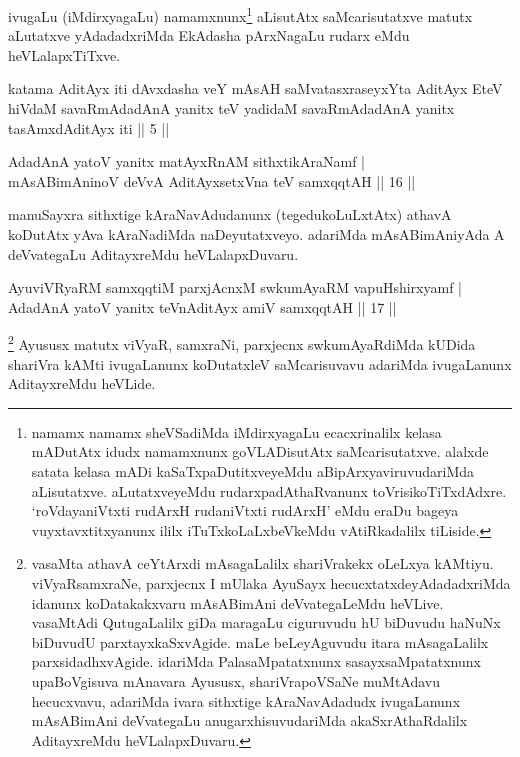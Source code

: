 \begin{artha}
ivugaLu (iMdirxyagaLu) namamxnunx\footnote[1]{namamx namamx sheVSadiMda iMdirxyagaLu ecacxrinalilx kelasa mADutAtx idudx namamxnunx goVLADisutAtx saMcarisutatxve. alalxde satata kelasa mADi kaSaTxpaDutitxveyeMdu aBipArxyaviruvudariMda aLisutatxve. aLutatxveyeMdu rudarxpadAthaRvanunx toVrisikoTiTxdAdxre. `roVdayaniVtxti rudArxH rudaniVtxti rudArxH' eMdu eraDu bageya vuyxtavxtitxyanunx ililx iTuTxkoLaLxbeVkeMdu vAtiRkadalilx tiLiside.} aLisutAtx saMcarisutatxve matutx aLutatxve yAdadadxriMda EkAdasha pArxNagaLu rudarx eMdu heVLalapxTiTxve.
\end{artha}



\begin{kandikeshl}
katama AditAyx iti dAvxdasha veY mAsAH saMvatasxraseyxYta AditAyx EteV hiVdaM savaRmAdadAnA yanitx teV yadidaM savaRmAdadAnA yanitx tasAmxdAditAyx iti || 5 ||
\end{kandikeshl}

\begin{shl}
AdadAnA yatoV yanitx matAyxRnAM sithxtikAraNamf |\\
mAsABimAninoV deVvA AditAyxsetxVna teV samxqqtAH \hfill || 16 ||
\end{shl}

\begin{artha}
manuSayxra sithxtige kAraNavAdudanunx (tegedukoLuLxtAtx) athavA koDutAtx yAva kAraNadiMda naDeyutatxveyo. adariMda mAsABimAniyAda A deVvategaLu AditayxreMdu heVLalapxDuvaru.
\end{artha}%


\begin{shl}
AyuviVRyaRM samxqqtiM parxjAcnxM swkumAyaRM vapuHshirxyamf |\\
AdadAnA yatoV yanitx teVnA\s \s ditAyx amiV samxqqtAH \hfill || 17 ||
\end{shl}

\begin{artha}
\footnote[1]{vasaMta athavA ceYtArxdi mAsagaLalilx shariVrakekx oLeLxya kAMtiyu. viVyaRsamxraNe, parxjecnx I mUlaka AyuSayx hecucxtatxdeyAdadadxriMda idanunx koDatakakxvaru mAsABimAni deVvategaLeMdu heVLive. vasaMtAdi QutugaLalilx giDa maragaLu ciguruvudu hU biDuvudu haNuNx biDuvudU parxtayxkaSxvAgide. maLe beLeyAguvudu itara mAsagaLalilx parxsidadhxvAgide. idariMda PalasaMpatatxnunx sasayxsaMpatatxnunx upaBoVgisuva mAnavara Ayususx, shariVrapoVSaNe muMtAdavu hecucxvavu, adariMda ivara sithxtige kAraNavAdadudx ivugaLanunx mAsABimAni deVvategaLu anugarxhisuvudariMda akaSxrAthaRdalilx AditayxreMdu heVLalapxDuvaru.} Ayususx matutx viVyaR, samxraNi, parxjecnx swkumAyaRdiMda kUDida shariVra kAMti ivugaLanunx koDutatxleV saMcarisuvavu adariMda ivugaLanunx AditayxreMdu heVLide.
\end{artha}

